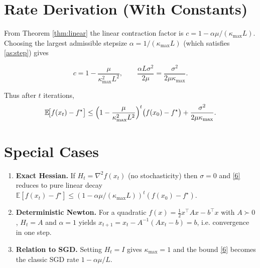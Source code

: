 \documentclass{article}
\newcommand{\E}{\mathbb{E}}
\begin{document}
\section*{Rate Derivation (With Constants)}
From Theorem \ref{thm:linear} the linear contraction factor is $c=1-\alpha\mu/(\kappa_{\max}L)$.  
Choosing the largest admissible stepsize $\alpha=1/(\kappa_{\max}L)$ (which satisfies \eqref{as:step}) gives  

\[
c = 1-\frac{\mu}{\kappa_{\max}^{2}L^{2}},\qquad
\frac{\alpha L\sigma^{2}}{2\mu}= \frac{\sigma^{2}}{2\mu\kappa_{\max}} .
\]

Thus after $t$ iterations,
\[
\E\!\big[f(x_t)-f^\star\big]\le
\Bigl(1-\frac{\mu}{\kappa_{\max}^{2}L^{2}}\Bigr)^{t}\bigl(f(x_0)-f^\star\bigr)
+\frac{\sigma^{2}}{2\mu\kappa_{\max}} .
\]

\section*{Special Cases}
\begin{enumerate}[leftmargin=*]
\item \textbf{Exact Hessian.} If $H_t=\nabla^2 f(x_t)$ (no stochasticity) then $\sigma=0$ and \eqref{6} reduces to pure linear decay 
$\E[f(x_t)-f^\star]\le (1-\alpha\mu/(\kappa_{\max}L))^{t}(f(x_0)-f^\star)$.
\item \textbf{Deterministic Newton.} For a quadratic $f(x)=\tfrac12 x^\top A x-b^\top x$ with $A\succ0$, $H_t=A$ and $\alpha=1$ yields $x_{t+1}=x_t-A^{-1}(Ax_t-b)=b$, i.e. convergence in one step.
\item \textbf{Relation to SGD.} Setting $H_t=I$ gives $\kappa_{\max}=1$ and the bound \eqref{6} becomes the classic SGD rate $1-\alpha\mu/L$.
\end{enumerate}
\end{document}
